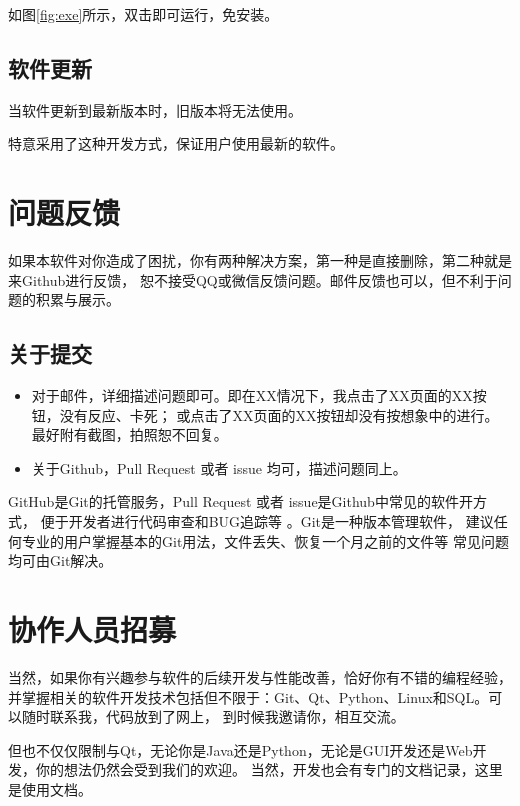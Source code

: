 \documentclass[cn, 11pt, chinese, show]{elegantbook}
\begin{document}
如图\ref{fig:exe}所示，双击即可运行，免安装。

\subsection{软件更新}

当软件更新到最新版本时，旧版本将无法使用。

\begin{remark}
特意采用了这种开发方式，保证用户使用最新的软件。
\end{remark}

\section{问题反馈}

如果本软件对你造成了困扰，你有两种解决方案，第一种是直接删除，第二种就是来Github进行反馈，
恕不接受QQ或微信反馈问题。邮件反馈也可以，但不利于问题的积累与展示。

\subsection{关于提交}

\begin{itemize}
  \item 对于邮件，详细描述问题即可。即在XX情况下，我点击了XX页面的XX按钮，没有反应、卡死；
  或点击了XX页面的XX按钮却没有按想象中的进行。最好附有截图，拍照恕不回复。
  \item 关于Github，Pull Request 或者 issue 均可，描述问题同上。
\end{itemize}

\begin{remark}
    GitHub是Git的托管服务，Pull Request 或者 issue是Github中常见的软件开方式， 便于开发者进行代码审查和BUG追踪等
    。Git是一种版本管理软件， 建议任何专业的用户掌握基本的Git用法，文件丢失、恢复一个月之前的文件等
    常见问题均可由Git解决。
\end{remark}

\section{协作人员招募}

当然，如果你有兴趣参与软件的后续开发与性能改善，恰好你有不错的编程经验，
并掌握相关的软件开发技术包括但不限于：Git、Qt、Python、Linux和SQL。可以随时联系我，代码放到了网上，
到时候我邀请你，相互交流。

但也不仅仅限制与Qt，无论你是Java还是Python，无论是GUI开发还是Web开发，你的想法仍然会受到我们的欢迎。
当然，开发也会有专门的文档记录，这里是使用文档。
\end{document}
